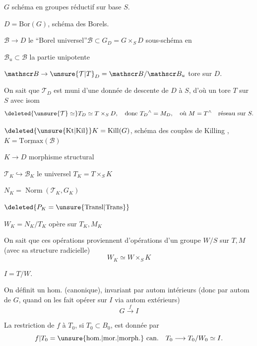 $G$ schéma en groupes réductif sur base $S$.

$D=\mathrm{Bor}(G)$, schéma des Borels.

$\mathscr B\longrightarrow D$ le ``Borel universel''\quad $\mathscr B\subset G_D=G\times_S D$ sous-schéma en 

$\mathscr B_u\subset\mathscr B$ la partie unipotente

$\mathscr B\to \unsure{\mathcal T|T}_D=\mathscr B/\mathscr B_u$ tore sur $D$.

On sait que $\mathcal T_D$ est muni d'une donnée de descente de $D$ à $S$, d'où un tore $T$ sur $S$  avec isom
\[
\deleted{\unsure{\mathcal T}\simeq} T_D\simeq T\times_S D,\quad
\text{donc } T_D{}^\wedge=M_D,\quad\text{où }M=T^\wedge\quad\text{réseau sur }S.
\]

$\deleted{\unsure{\mathrm{Kt}|\mathrm{Kil}}}K=\mathrm{Kill}(G)$, schéma des couples de Killing , $K=\underline{\mathrm{Tormax}}(\mathscr B)$

$K\longrightarrow D$  morphisme structural

$\mathcal T_K\hookrightarrow\mathscr B_K$ le  universel \quad $T_K=T\times_S K$

$N_K=\operatorname{Norm}(\mathcal T_K,G_K)$

$\deleted{P_K=\unsure{\mathrm{Transl}|\mathrm{Trans}}}$

$W_K=N_K/T_K$ opère sur $T_K,M_K$

On sait que ces opérations proviennent d'opérations d'un groupe $W/S$ sur $T,M$ (avec sa structure radicielle)
\[
W_K\simeq W\times_S K
\]

 $I=T/W$.

On définit un  hom. (canonique), invariant par autom intérieurs (donc par  autom de $G$, quand on les fait opérer sur $I$ via autom extérieurs)
\[
G\xrightarrow{f} I
\]

La restriction de $f$ à $T_0$, si $T_0\subset B_0$, est donnée par
\[
f|T_0=\unsure{\text{hom.}|\text{mor.}|\text{morph.}}\ \text{can.}\quad T_0\longrightarrow T_0/W_0\simeq I.
\]
